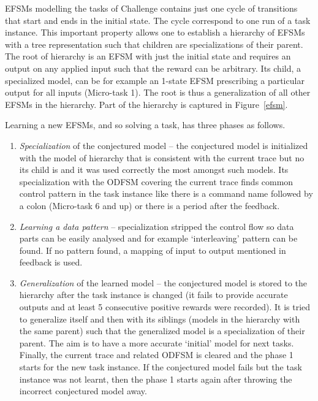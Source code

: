 \documentclass{article} %
\begin{document}
EFSMs modelling the tasks of Challenge contains just one cycle of transitions that start and ends in the initial state.
The cycle correspond to one run of a task instance.
This important property allows one to establish a hierarchy of EFSMs
with a tree representation such that children are specializations of their parent.
The root of hierarchy is an EFSM with just the initial state and requires an output on any applied input
such that the reward can be arbitrary.
Its child, a specialized model, can be for example an 1-state EFSM prescribing a particular output for all inputs (Micro-task 1).
The root is thus a generalization of all other EFSMs in the hierarchy. 
Part of the hierarchy is captured in Figure~\ref{efsm}.

Learning a new EFSMs, and so solving a task, has three phases as follows.

\begin{enumerate}
\item {\em Specialization} of the conjectured model -- the conjectured model is initialized
with the model of hierarchy that is consistent with the current trace but no its child is and
 it was used correctly the most amongst such models.
Its specialization with the ODFSM covering the current trace finds common control pattern in the task instance
like there is a command name followed by a colon (Micro-task 6 and up) or there is a period after the feedback.
\item {\em Learning a data pattern} -- specialization stripped the control flow so data parts can be easily analysed
and for example `interleaving' pattern can be found. 
If no pattern found, a mapping of input to output mentioned in feedback is used.
\item {\em Generalization} of the learned model -- the conjectured model is stored to the hierarchy after
the task instance is changed (it fails to provide accurate outputs and at least 5 consecutive positive rewards were recorded).
It is tried to generalize itself and then with its siblings (models in the hierarchy with the same parent) such that
the generalized model is a specialization of their parent. 
The aim is to have a more accurate `initial' model for next tasks.
Finally, the current trace and related ODFSM is cleared and the phase 1 starts for the new task instance.
If the conjectured model fails but the task instance was not learnt, 
then the phase 1 starts again after throwing the incorrect conjectured model away.
\end{enumerate}
\end{document}
